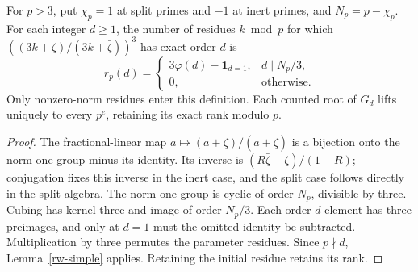 \begin{lemma}\label{rw-exact-rank}
For $p>3$, put $\chi_p=1$ at split primes and $-1$ at inert primes,
and $N_p=p-\chi_p$. For each integer $d\ge1$, the number of residues $k\bmod p$ for which
$((3k+\zeta)/(3k+\bar\zeta))^3$ has exact order $d$ is
\[
 r_p(d)=
 \begin{cases}
 3\varphi(d)-\mathbf1_{d=1},&d\mid N_p/3,\\
 0,&\text{otherwise}.
 \end{cases}
\]
Only nonzero-norm residues enter this definition. Each counted root
of $G_d$ lifts uniquely to every $p^e$, retaining its exact rank
modulo $p$.
\end{lemma}
\begin{proof}
The fractional-linear map $a\mapsto(a+\zeta)/(a+\bar\zeta)$ is
a bijection onto the norm-one group minus its identity. Its inverse
is $(R\bar\zeta-\zeta)/(1-R)$; conjugation fixes this inverse in
the inert case, and the split case follows directly in the split
algebra. The norm-one group is cyclic of order $N_p$, divisible by
three. Cubing has kernel three and image of order $N_p/3$.
Each order-$d$ element has three preimages, and only at $d=1$ must
the omitted identity be subtracted. Multiplication by three permutes
the parameter residues. Since $p\nmid d$, Lemma~\ref{rw-simple}
applies. Retaining the initial residue retains its rank.
\end{proof}

